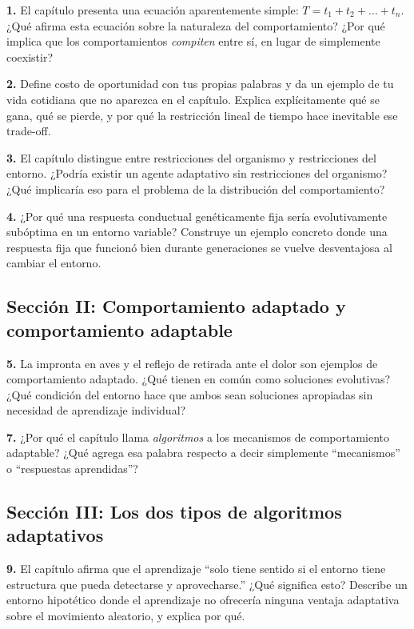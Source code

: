 \documentclass[
  letterpaper,
  DIV=11,
  numbers=noendperiod]{scrreprt}
\begin{document}
\textbf{1.} El capítulo presenta una ecuación aparentemente simple:
\(T = t_1 + t_2 + \dots + t_n\). ¿Qué afirma esta ecuación sobre la
naturaleza del comportamiento? ¿Por qué implica que los comportamientos
\emph{compiten} entre sí, en lugar de simplemente coexistir?

\textbf{2.} Define costo de oportunidad con tus propias palabras y da un
ejemplo de tu vida cotidiana que no aparezca en el capítulo. Explica
explícitamente qué se gana, qué se pierde, y por qué la restricción
lineal de tiempo hace inevitable ese trade-off.

\textbf{3.} El capítulo distingue entre restricciones del organismo y
restricciones del entorno. ¿Podría existir un agente adaptativo sin
restricciones del organismo? ¿Qué implicaría eso para el problema de la
distribución del comportamiento?

\textbf{4.} ¿Por qué una respuesta conductual genéticamente fija sería
evolutivamente subóptima en un entorno variable? Construye un ejemplo
concreto donde una respuesta fija que funcionó bien durante generaciones
se vuelve desventajosa al cambiar el entorno.

\subsection{Sección II: Comportamiento adaptado y comportamiento
adaptable}\label{secciuxf3n-ii-comportamiento-adaptado-y-comportamiento-adaptable}

\textbf{5.} La impronta en aves y el reflejo de retirada ante el dolor
son ejemplos de comportamiento adaptado. ¿Qué tienen en común como
soluciones evolutivas? ¿Qué condición del entorno hace que ambos sean
soluciones apropiadas sin necesidad de aprendizaje individual?

\textbf{7.} ¿Por qué el capítulo llama \emph{algoritmos} a los
mecanismos de comportamiento adaptable? ¿Qué agrega esa palabra respecto
a decir simplemente ``mecanismos'' o ``respuestas aprendidas''?

\subsection{Sección III: Los dos tipos de algoritmos
adaptativos}\label{secciuxf3n-iii-los-dos-tipos-de-algoritmos-adaptativos}

\textbf{9.} El capítulo afirma que el aprendizaje ``solo tiene sentido
si el entorno tiene estructura que pueda detectarse y aprovecharse.''
¿Qué significa esto? Describe un entorno hipotético donde el aprendizaje
no ofrecería ninguna ventaja adaptativa sobre el movimiento aleatorio, y
explica por qué.
\end{document}
